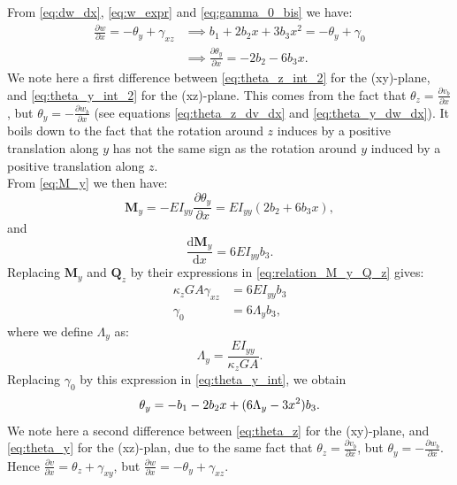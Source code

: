 \documentclass[a4paper,11pt]{article}
\newcommand{\bM}{\mathbf{M}}
\newcommand{\bQ}{\mathbf{Q}}
\newcommand{\dif}{\mathrm{d}}
\begin{document}
\noindent From \eqref{eq:dw_dx}, \eqref{eq:w_expr} and \eqref{eq:gamma_0_bis} we
have:
\begin{align}
	\frac{\partial w}{\partial x} = -\theta_y + \gamma_{xz} & \implies b_1 + 2b_2x + 3b_3x^2 = -\theta_y + \gamma_0 \label{eq:theta_y_int} \\
	& \implies \frac{\partial \theta_y}{\partial x} = -2b_2 - 6b_3x. \label{eq:theta_y_int_2}
\end{align}
\textcolor{color2}{We note here a first difference between \eqref{eq:theta_z_int_2}
for the (xy)-plane, and \eqref{eq:theta_y_int_2} for the (xz)-plane. This comes
from the fact that $\theta_z = \frac{\partial v_b}{\partial x}$, but $\theta_y = -
\frac{\partial w_b}{\partial x}$ (see equations \eqref{eq:theta_z_dv_dx} and
\eqref{eq:theta_y_dw_dx}). It boils down to the fact that the rotation around $z$
induces by a positive translation along $y$ has not the same sign as the rotation
around $y$ induced by a positive translation along $z$.}\\

\noindent From \eqref{eq:M_y} we then have:
\begin{equation}
	\bM_y = -EI_{yy}\frac{\partial \theta_y}{\partial x} = EI_{yy}(2b_2 + 6b_3x),
\end{equation}
and
\begin{equation}
\frac{\dif \bM_y}{\dif x} = 6 EI_{yy} b_3.
\end{equation}
Replacing $\bM_y$ and $\bQ_z$ by their expressions in \eqref{eq:relation_M_y_Q_z}
gives:
\begin{align}
\kappa_z G A \gamma_{xz} & = 6 EI_{yy} b_3 \\
\gamma_0 & = 6\Lambda_y b_3,
\end{align}
where we define $\Lambda_y$ as:
\begin{equation}
	\Lambda_y = \frac{EI_{yy}}{\kappa_z G A}.
\end{equation}
Replacing $\gamma_0$ by this expression in \eqref{eq:theta_y_int}, we obtain
\begin{equation} \label{eq:theta_y}
	\theta_y = -b_1 - 2b_2x + (6\Lambda_y - 3x^2)b_3.\\
\end{equation}
\textcolor{color2}{We note here a second difference between \eqref{eq:theta_z} for
the (xy)-plane, and \eqref{eq:theta_y} for the (xz)-plan, due to the same fact that
$\theta_z = \frac{\partial v_b}{\partial x}$, but $\theta_y = -\frac{\partial w_b}
{\partial x}$. Hence $\frac{\partial v}{\partial x} = \theta_z + \gamma_{xy}$, but
$\frac{\partial w}{\partial x} = -\theta_y + \gamma_{xz}$.}\\
\end{document}
